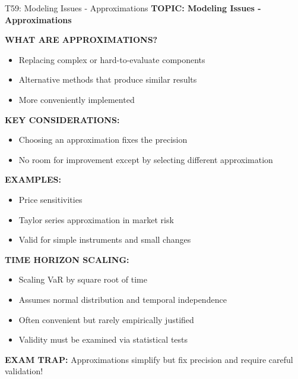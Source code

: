 \documentclass[8pt]{beamer}
\begin{document}
	\begin{frame}{T59: Modeling Issues - Approximations}
		\fontsize{6.5}{7.5}\selectfont
		\textbf{TOPIC: Modeling Issues - Approximations}
		
		\vspace{0.1cm}
		\textbf{WHAT ARE APPROXIMATIONS?}
		\begin{itemize}
			\item Replacing complex or hard-to-evaluate components
			\item Alternative methods that produce similar results
			\item More conveniently implemented
		\end{itemize}
		
		\vspace{0.1cm}
		\textbf{KEY CONSIDERATIONS:}
		\begin{itemize}
			\item Choosing an approximation fixes the precision
			\item No room for improvement except by selecting different approximation
		\end{itemize}
		
		\vspace{0.1cm}
		\textbf{EXAMPLES:}
		\begin{itemize}
			\item Price sensitivities
			\item Taylor series approximation in market risk
			\item Valid for simple instruments and small changes
		\end{itemize}
		
		\vspace{0.1cm}
		\textbf{TIME HORIZON SCALING:}
		\begin{itemize}
			\item Scaling VaR by square root of time
			\item Assumes normal distribution and temporal independence
			\item Often convenient but rarely empirically justified
			\item Validity must be examined via statistical tests
		\end{itemize}
		
		\textcolor{myred}{\textbf{EXAM TRAP:}} Approximations simplify but \textcolor{myblue}{fix precision and require careful validation}!
	\end{frame}
	
\end{document}
